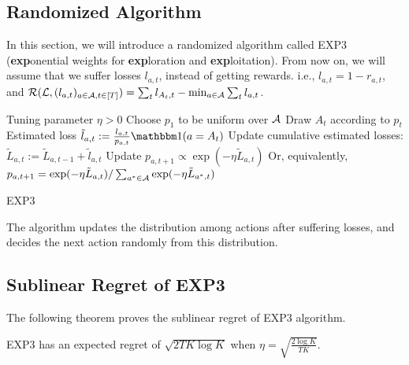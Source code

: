 \documentclass[11pt]{article}
\begin{document}
\subsection{Randomized Algorithm}
In this section, we will introduce a randomized algorithm called EXP3 (\textbf{exp}onential weights for \textbf{exp}loration and \textbf{exp}loitation). From now on, we will assume that we suffer losses $l_{a, t}$, instead of getting rewards. i.e., $l_{a, t} = 1 - r_{a, t}$, and $\mathcal{R}(\mathcal{L}, (l_{a, t})_{a\in\mathcal{A}, t \in [T]}) = \sum_t l_{A_t, t} - \min_{a \in \mathcal{A}} \sum_t l_{a, t}$. 

\begin{algorithm}
	\begin{algorithmic}[1]
		\STATE Tuning parameter $\eta >0$
		\STATE Choose $p_1$ to be uniform over $\mathcal{A}$
		\STATE Draw $A_t$ according to $p_t$
		\STATE Estimated loss $\tilde l_{a, t} := \frac{l_{a, t}}{p_{a, t}} \ind(a=A_t)$
		\STATE Update cumulative estimated losses: $\tilde L_{a, t} := \tilde L_{a, t-1} + \tilde l_{a, t}$
		\STATE Update $p_{a, t+1} \propto \exp(-\eta \tilde L_{a, t})$
		\STATE Or, equivalently, $p_{a, t+1} = \exp(-\eta \tilde L_{a, t}) /\sum_{a^*\in\mathcal{A}}\exp(-\eta \tilde L_{a^*, t})$
		\ENDFOR 
		\end{algorithmic}
		\caption{EXP3}
\end{algorithm}

The algorithm updates the distribution among actions after suffering losses, and decides the next action randomly from this distribution. 

\subsection{Sublinear Regret of EXP3}
The following theorem proves the sublinear regret of EXP3 algorithm. 

\begin{theorem}
    EXP3 has an expected regret of $\sqrt{2TK\log K}$ when $\eta = \sqrt{\frac{2\log K}{TK}}$.
\end{theorem}
\end{document}
